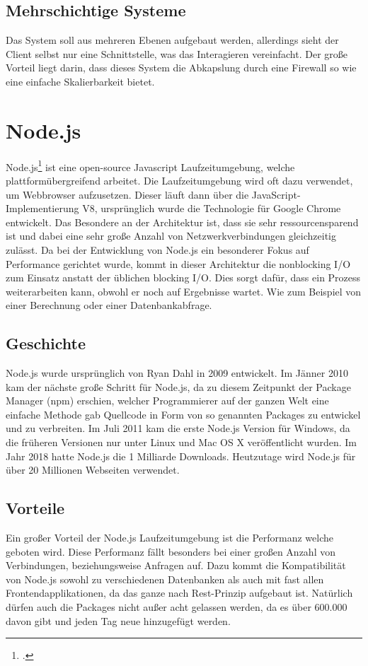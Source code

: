 \subsection{Mehrschichtige Systeme}
Das System soll aus mehreren Ebenen aufgebaut werden, allerdings sieht der Client selbst nur eine Schnittstelle, was das Interagieren vereinfacht. Der große Vorteil liegt darin, dass dieses System die Abkapslung durch eine Firewall so wie eine einfache Skalierbarkeit bietet.		 	
\section{Node.js}
Node.js\footcite{nodejs} ist eine open-source Javascript Laufzeitumgebung, welche plattformübergreifend arbeitet. 
Die Laufzeitumgebung wird oft dazu verwendet, um Webbrowser aufzusetzen. 
Dieser läuft dann über die JavaScript-Implementierung V8, ursprünglich wurde die Technologie für Google Chrome entwickelt. 
Das Besondere an der Architektur ist, dass sie sehr ressourcensparend ist und dabei eine sehr große Anzahl von Netzwerkverbindungen gleichzeitig zulässt. 
Da bei der Entwicklung von Node.js ein besonderer Fokus auf Performance gerichtet wurde, kommt in dieser Architektur die nonblocking I/O zum Einsatz anstatt der üblichen blocking I/O. Dies sorgt dafür, dass ein Prozess weiterarbeiten kann, obwohl er noch auf Ergebnisse wartet.
Wie zum Beispiel von einer Berechnung oder einer Datenbankabfrage. 		 	
\subsection{Geschichte}
Node.js wurde ursprünglich von Ryan Dahl in 2009 entwickelt. 
Im Jänner 2010 kam der nächste große Schritt für Node.js, da zu diesem Zeitpunkt der Package Manager (npm) erschien, welcher Programmierer auf der ganzen Welt eine einfache Methode gab Quellcode in Form von so genannten Packages zu entwickel und zu verbreiten. 
Im Juli 2011 kam die erste Node.js Version für Windows, da die früheren Versionen nur unter Linux und Mac OS X veröffentlicht wurden. Im Jahr 2018 hatte Node.js die 1 Milliarde Downloads. Heutzutage wird Node.js für über 20 Millionen Webseiten verwendet. 		 		
\subsection{Vorteile}
Ein großer Vorteil der Node.js Laufzeitumgebung ist die Performanz welche geboten wird. 
Diese Performanz fällt besonders bei einer großen Anzahl von Verbindungen, beziehungsweise Anfragen auf. 
Dazu kommt die Kompatibilität von Node.js sowohl zu verschiedenen Datenbanken als auch mit fast allen Frontendapplikationen, da das ganze nach Rest-Prinzip aufgebaut ist. 
Natürlich dürfen auch die Packages nicht außer acht gelassen werden, da es über 600.000 davon gibt und jeden Tag neue hinzugefügt werden.		 		

